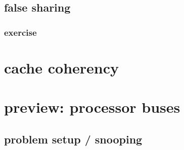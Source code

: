 \subsection{false sharing}

\subsubsection{exercise}


\section{cache coherency}
\section{preview: processor buses}


\subsection{problem setup / snooping}

